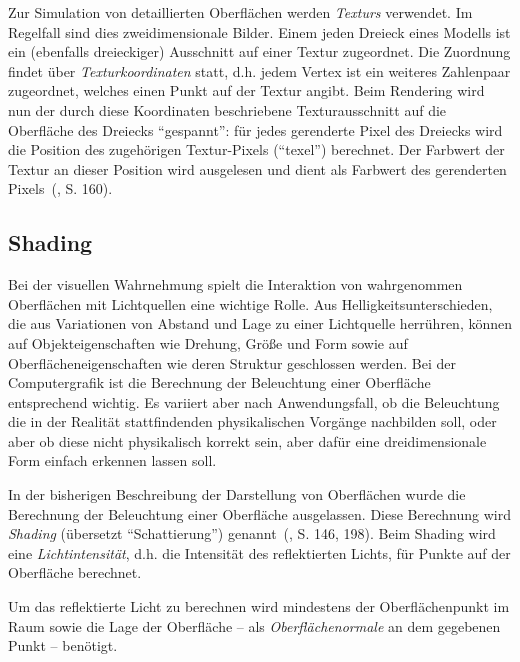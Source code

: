 \documentclass[twoside,a4paper,fleqn,12pt]{book}
\begin{document}
Zur Simulation von detaillierten Oberflächen werden \emph{\glspl{Textur}} verwendet. Im Regelfall sind dies zweidimensionale
Bilder. Einem jeden Dreieck eines Modells ist ein (ebenfalls dreieckiger) Ausschnitt auf einer Textur zugeordnet. 
Die Zuordnung findet über \emph{Texturkoordinaten} statt, d.h. jedem Vertex ist ein weiteres Zahlenpaar zugeordnet,
welches einen Punkt auf der Textur angibt.
Beim Rendering wird nun der durch diese Koordinaten beschriebene Texturausschnitt auf die Oberfläche des Dreiecks 
"`gespannt"': für jedes gerenderte Pixel des Dreiecks wird die Position des zugehörigen Textur-Pixels (``texel'')
berechnet. Der Farbwert der Textur an dieser Position wird ausgelesen und dient als Farbwert des gerenderten Pixels~(\cite{watt_de}, S. 160).

\subsection{Shading}

Bei der visuellen Wahrnehmung spielt die Interaktion von wahrgenommen Oberflächen mit Lichtquellen eine wichtige
Rolle. Aus Helligkeitsunterschieden, die aus Variationen von Abstand und Lage zu einer Lichtquelle
herrühren, können auf Objekteigenschaften wie Drehung, Größe und Form sowie auf Oberflächeneigenschaften
wie deren Struktur geschlossen werden.
Bei der Computergrafik ist die Berechnung der Beleuchtung einer Oberfläche
entsprechend wichtig. Es variiert aber nach Anwendungsfall, ob die Beleuchtung die in der Realität stattfindenden physikalischen Vorgänge
nachbilden soll, oder aber ob diese nicht physikalisch korrekt sein, aber dafür
eine dreidimensionale Form einfach erkennen lassen soll.

In der bisherigen Beschreibung der Darstellung von Oberflächen wurde die Berechnung der Beleuchtung einer
Oberfläche ausgelassen. Diese Berechnung wird \emph{\gls{Shading}} (übersetzt "`Schattierung"') genannt~(\cite{watt_de}, S. 146, 198).
Beim Shading wird eine \emph{Lichtintensität}, d.h. die Intensität des reflektierten Lichts, für Punkte auf der
Oberfläche berechnet.

Um das reflektierte Licht zu berechnen wird mindestens der Oberflächenpunkt im Raum sowie die Lage der Oberfläche
-- als \emph{Oberflächenormale} an dem gegebenen Punkt -- benötigt.
\end{document}
